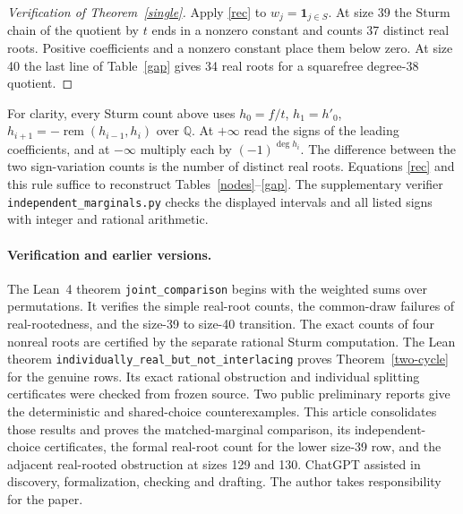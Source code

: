 \documentclass[10pt,a4paper]{article}
\begin{document}
\begin{proof}[Verification of Theorem~\ref{single}]
Apply \eqref{rec} to $w_j=\mathbf1_{j\in S}$. At size 39 the Sturm chain of the quotient by $t$ ends in a nonzero constant and counts 37 distinct real roots. Positive coefficients and a nonzero constant place them below zero. At size 40 the last line of Table~\ref{gap} gives 34 real roots for a squarefree degree-38 quotient.
\end{proof}

For clarity, every Sturm count above uses $h_0=f/t$, $h_1=h'_0$, $h_{i+1}=-\operatorname{rem}(h_{i-1},h_i)$ over $\mathbb Q$. At $+\infty$ read the signs of the leading coefficients, and at $-\infty$ multiply each by $(-1)^{\deg h_i}$. The difference between the two sign-variation counts is the number of distinct real roots. Equations \eqref{rec} and this rule suffice to reconstruct Tables~\ref{nodes}--\ref{gap}. The supplementary verifier \texttt{independent\_marginals.py} checks the displayed intervals and all listed signs with integer and rational arithmetic.



\paragraph{Verification and earlier versions.}
The Lean~4 theorem \texttt{joint\_comparison} begins with the weighted sums over permutations. It verifies the simple real-root counts, the common-draw failures of real-rootedness, and the size-39 to size-40 transition. The exact counts of four nonreal roots are certified by the separate rational Sturm computation. The Lean theorem \texttt{individually\_real\_but\_not\_interlacing} proves Theorem~\ref{two-cycle} for the genuine rows. Its exact rational obstruction and individual splitting certificates were checked from frozen source. Two public preliminary reports \cite{z40,zmix} give the deterministic and shared-choice counterexamples. This article consolidates those results and proves the matched-marginal comparison, its independent-choice certificates, the formal real-root count for the lower size-39 row, and the adjacent real-rooted obstruction at sizes 129 and 130. ChatGPT assisted in discovery, formalization, checking and drafting. The author takes responsibility for the paper.
\end{document}
